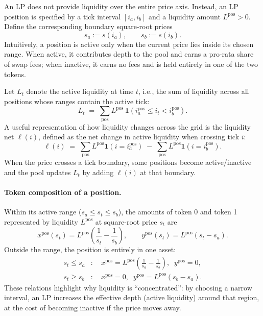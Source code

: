 \documentclass[11pt]{article}
\begin{document}
An LP does not provide liquidity over the entire price axis. Instead, an LP position is specified by
a tick interval $[i_a,i_b]$ and a liquidity amount $L^{\mathrm{pos}}>0$.
Define the corresponding boundary square-root prices
\begin{equation}
  s_a := s(i_a), \qquad s_b := s(i_b).
\end{equation}
Intuitively, a position is active only when the current price lies inside its chosen range. When active, it contributes depth to the pool and earns a pro-rata share of swap fees; when inactive, it earns no fees and is held entirely in one of the two tokens.

Let $L_t$ denote the active liquidity at time $t$, i.e., the sum of liquidity across all positions whose ranges contain the active tick:
\begin{equation}
  L_t \;=\; \sum_{\mathrm{pos}} L^{\mathrm{pos}}\,\mathbf{1}\!\left(i_a^{\mathrm{pos}} \le i_t < i_b^{\mathrm{pos}}\right).
\end{equation}
A useful representation of how liquidity changes across the grid is the liquidity net $\ell(i)$, defined as the net change in active liquidity when crossing tick $i$:
\begin{equation}
  \ell(i) \;=\; \sum_{\mathrm{pos}} L^{\mathrm{pos}}\mathbf{1}(i = i_a^{\mathrm{pos}})\;-\;\sum_{\mathrm{pos}} L^{\mathrm{pos}}\mathbf{1}(i = i_b^{\mathrm{pos}}).
\end{equation}
When the price crosses a tick boundary, some positions become active/inactive and the pool updates $L_t$ by adding $\ell(i)$ at that boundary.

\paragraph{Token composition of a position.}
Within its active range ($s_a \le s_t \le s_b$), the amounts of token 0 and token 1 represented by liquidity $L^{\mathrm{pos}}$ at square-root price $s_t$ are
\begin{equation}
  x^{\mathrm{pos}}(s_t) = L^{\mathrm{pos}}\!\left(\frac{1}{s_t} - \frac{1}{s_b}\right),
  \qquad
  y^{\mathrm{pos}}(s_t) = L^{\mathrm{pos}}\!\left(s_t - s_a\right).
\end{equation}
Outside the range, the position is entirely in one asset:
\begin{equation}
  \begin{aligned}
    s_t \le s_a &: \quad x^{\mathrm{pos}} = L^{\mathrm{pos}}\!\left(\frac{1}{s_a} - \frac{1}{s_b}\right), \;\; y^{\mathrm{pos}}=0,\\
    s_t \ge s_b &: \quad x^{\mathrm{pos}} = 0, \;\; y^{\mathrm{pos}}= L^{\mathrm{pos}}\!\left(s_b - s_a\right).
  \end{aligned}
\end{equation}
These relations highlight why liquidity is ``concentrated'': by choosing a narrow interval, an LP increases the effective depth (active liquidity) around that region, at the cost of becoming inactive if the price moves away.
\end{document}
